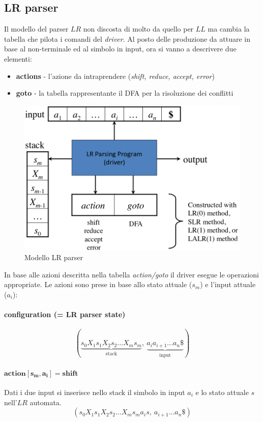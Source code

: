 \subsection{LR parser}
Il modello del parser $LR$ non discosta di molto da quello per $LL$ ma cambia
la tabella che pilota i comandi del \textit{driver}. Al posto delle produzione
da attuare in base al non-terminale ed al simbolo in input, ora si vanno a
descrivere due elementi:
\begin{itemize}
\item \textbf{actions} - l'azione da intraprendere (\textit{shift, reduce,
accept, error})
\item \textbf{goto} - la tabella rappresentante il DFA per la risoluzione dei
conflitti
\end{itemize}

\begin{figure}[H]
\centering
\includegraphics[scale=0.3]{res/image/LR_model}
\caption{Modello LR parser}
\label{img:LR_model}

\end{figure}
In base alle azioni descritta nella tabella \textit{action/goto} il driver
esegue le operazioni appropriate. Le azioni sono prese in base allo stato
attuale ($s_m$) e l'input attuale ($a_i$):

\paragraph{configuration (= LR parser state)}
$$(\underbrace{s_0X_1s_1X_2s_2...X_ms_m}_\text{stack},\
\underbrace{a_ia_{i+1}...a_n\$}_\text{input})$$

\paragraph{$\mathbf{action[s_m,a_i]=shift}$}
Dati i due input si inserisce nello stack il simbolo in input $a_i$ e lo stato
attuale $s$ nell'$LR$ automata.
$$(s_0X_1s_1X_2s_2...X_ms_ma_is,\ a_{i+1}...a_n\$)$$

